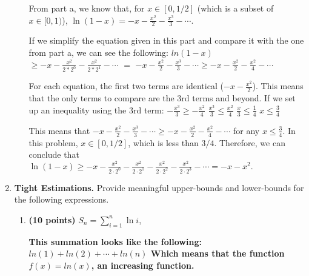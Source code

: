 \documentclass[11pt]{article}
\begin{document}
\begin{enumerate}
\begin{enumerate}
{      From part a, we know that, for $x\in[0,1/2]$ (which is a subset of $x\in[0,1)$), \newline
      $\ln(1-x) = -x - \frac{x^2}2 - \frac{x^3}3 - \dotsi.$ \newline
      \newline

      If we simplify the equation given in this part and compare it with the one from part a, we can see the following: \newline
      $ln(1-x)$ \hspace{39px} $\geq -x-\frac{x^2}{2*2^0}-\frac{x^2}{2*2^1}-\dotsi$ \newline
      $=$ \newline
      $-x-\frac{x^2}2-\frac{x^3}3-\dotsi \geq -x-\frac{x^2}2-\frac{x^2}4-\dotsi$ \newline

      For each equation, the first two terms are identical ($-x-\frac{x^2}2$). This means that the only terms to compare are the 3rd terms and beyond. If we set up an inequality using the 3rd term: \newline
      $-\frac{x^3}3 \geq -\frac{x^2}4$ \newline
      $\frac{x^3}3 \leq \frac{x^2}4$ \newline
      $\frac{x}3 \leq \frac14$ \newline
      $x \leq \frac34$ \newline
      \newline
      
      This means that $-x-\frac{x^2}2-\frac{x^3}3-\dotsi \geq -x-\frac{x^2}2-\frac{x^2}4-\dotsi$ for any $x \leq \frac34$. In this problem, $x\in[0,1/2]$, which is less than $3/4$. Therefore, we can conclude that 
      $\ln(1-x) \geq -x - \frac{x^2}{2\cdot 2^0} - \frac{x^2}{2\cdot 2^1} -\frac{x^2}{2\cdot 2^2} - \frac{x^2}{2\cdot 2^3} - \dotsi = -x-x^2.$
    }
  \newpage  
\end{enumerate}







\item {\bfseries Tight Estimations.} 
  Provide meaningful upper-bounds and lower-bounds for the following expressions.
  \begin{enumerate}
  \item {\bfseries (10 points)} $S_n = \sum_{i=1}^n \ln i$,   \newline
    {\bfseries
      \newline
      \newline
      This summation looks like the following: \newline
      $ln(1) + ln(2) + \dotsi + ln(n)$ \newline
      Which means that the function $f(x) = ln(x)$, an increasing function.\newline
      \newline

}
\end{enumerate}
\end{enumerate}
\end{document}
